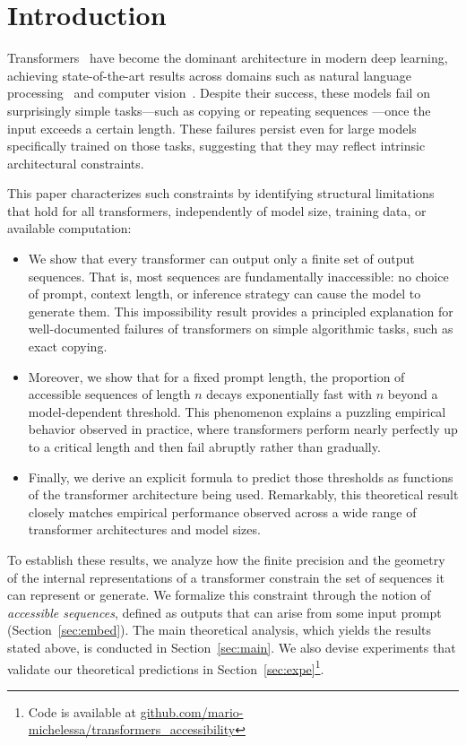 
\section{Introduction}

Transformers~\citep{Vaswani_A_2017_p-nips-OG} have become the dominant architecture in modern deep learning, achieving state-of-the-art results across domains such as natural language processing~\citep{wolf-etal-2020-transformers} and computer vision~\citep{dosovitskiy2021an, zhao2021point, zhai2022scaling}. Despite their success, these models fail on surprisingly simple tasks---such as copying or repeating sequences \citep{Jelassi2024RepeatAM}---once the input exceeds a certain length. These failures persist even for large models specifically trained on those tasks, suggesting that they may reflect intrinsic architectural constraints.

\vspace{1em}
This paper characterizes such constraints by identifying structural limitations that hold for all transformers, independently of model size, training data, or available computation:
\begin{itemize}
    \item We show that every transformer can output only a finite set of output sequences. That is, most sequences are fundamentally inaccessible: no choice of prompt, context length, or inference strategy can cause the model to generate them. This impossibility result provides a principled explanation for well-documented failures of transformers on simple algorithmic tasks, such as exact copying.
    \item Moreover, we show that for a fixed prompt length, the proportion of accessible sequences of length $n$ decays exponentially fast with $n$ beyond a model-dependent threshold. This phenomenon explains a puzzling empirical behavior observed in practice, where transformers perform nearly perfectly up to a critical length and then fail abruptly rather than gradually.
    \item Finally, we derive an explicit formula to predict those thresholds as functions of the transformer architecture being used. Remarkably, this theoretical result closely matches empirical performance observed across a wide range of transformer architectures and model sizes.
\end{itemize}

To establish these results, we analyze how the finite precision and the geometry of the internal representations of a transformer constrain the set of sequences it can represent or generate. We formalize this constraint through the notion of \emph{accessible sequences}, defined as outputs that can arise from some input prompt (Section~\ref{sec:embed}). The main theoretical analysis, which yields the results stated above, is conducted in Section~\ref{sec:main}. We also devise experiments that validate our theoretical predictions in Section~\ref{sec:expe}\footnote{Code is available at \href{https://github.com/mario-michelessa/transformers\_accessibility}{github.com/mario-michelessa/transformers\_accessibility}}.

